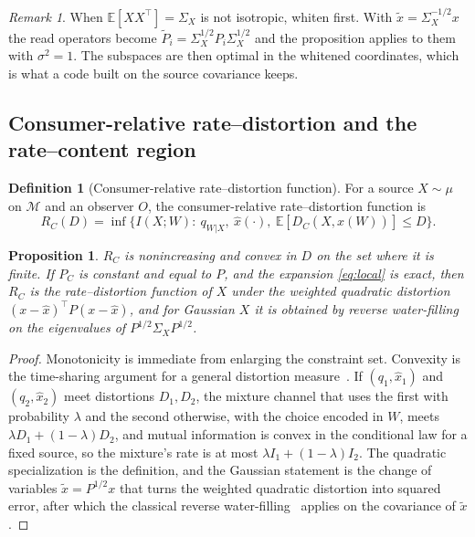\documentclass[11pt]{article}
\newtheorem{proposition}{Proposition}
\theoremstyle{definition}
\newtheorem{definition}{Definition}
\theoremstyle{remark}
\newtheorem*{remark}{Remark}
\newcommand{\PC}{P_{C}}
\newcommand{\M}{\mathcal{M}}
\newcommand{\E}{\mathbb{E}}
\begin{document}
\begin{remark}
When $\E[XX^{\top}]=\Sigma_{X}$ is not isotropic, whiten first. With $\tilde{x}=\Sigma_{X}^{-1/2}x$ the read operators become $\tilde{P}_{i}=\Sigma_{X}^{1/2}P_{i}\Sigma_{X}^{1/2}$ and the proposition applies to them with $\sigma^{2}=1$.
The subspaces are then optimal in the whitened coordinates, which is what a code built on the source covariance keeps.
\end{remark}

\subsection{Consumer-relative rate--distortion and the rate--content region}

\begin{definition}[Consumer-relative rate--distortion function]
\label{def:RD}
For a source $X\sim\mu$ on $\M$ and an observer $O$, the consumer-relative rate--distortion function is
\begin{equation}
R_{C}(D)=\inf\bigl\{I(X;W):\ q_{W|X},\ \hat{x}(\cdot),\ \E[D_{C}(X,\hat{x}(W))]\le D\bigr\}.
\label{eq:RC}
\end{equation}
\end{definition}

\begin{proposition}
\label{prop:RD}
$R_{C}$ is nonincreasing and convex in $D$ on the set where it is finite. If $\PC$ is constant and equal to $P$, and the expansion \eqref{eq:local} is exact, then $R_{C}$ is the rate--distortion function of $X$ under the weighted quadratic distortion $(x-\hat{x})^{\top}P(x-\hat{x})$, and for Gaussian $X$ it is obtained by reverse water-filling on the eigenvalues of $P^{1/2}\Sigma_{X}P^{1/2}$.
\end{proposition}

\begin{proof}
Monotonicity is immediate from enlarging the constraint set.
Convexity is the time-sharing argument for a general distortion measure~\cite{cover2006}. If $(q_{1},\hat{x}_{1})$ and $(q_{2},\hat{x}_{2})$ meet distortions $D_{1},D_{2}$, the mixture channel that uses the first with probability $\lambda$ and the second otherwise, with the choice encoded in $W$, meets $\lambda D_{1}+(1-\lambda)D_{2}$, and mutual information is convex in the conditional law for a fixed source, so the mixture's rate is at most $\lambda I_{1}+(1-\lambda)I_{2}$.
The quadratic specialization is the definition, and the Gaussian statement is the change of variables $\tilde{x}=P^{1/2}x$ that turns the weighted quadratic distortion into squared error, after which the classical reverse water-filling~\cite{cover2006} applies on the covariance of $\tilde{x}$.
\end{proof}
\end{document}
